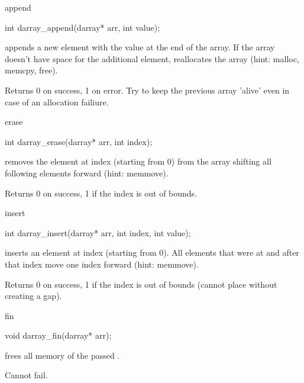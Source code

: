\documentclass[10pt,graphics,aspectratio=169,table]{beamer}
\begin{document}
\begin{frame}[fragile]{append}
    \begin{codeblock}
int darray_append(darray* arr, int value);
    \end{codeblock}

     appends a new element with the value  
    at the end of the array. If the array doesn't have space
    for the additional element, reallocates the array 
    (hint: malloc, memcpy, free).
    
    Returns 0 on success, 1 on error. Try to keep the previous array 'alive'
    even in case of an allocation failiure.
\end{frame}

\begin{frame}[fragile]{erase}
    \begin{codeblock}
int darray_erase(darray* arr, int index);
    \end{codeblock}

     removes the  element at index 
     (starting from 0) 
    from the array shifting all following elements forward (hint: memmove).
    
    Returns 0 on success, 1 if the index is out of bounds.
\end{frame}


\begin{frame}[fragile]{insert}
    \begin{codeblock}
int darray_insert(darray* arr, int index, int value);
    \end{codeblock}

     inserts an element at index  
     (starting from 0). 
    All elements that were at and after that index move one
    index forward (hint: memmove).
    
    Returns 0 on success, 1 if the index is out of bounds 
    (cannot place without creating a gap).
\end{frame}

\begin{frame}[fragile]{fin}
    \begin{codeblock}
void darray_fin(darray* arr);
    \end{codeblock}

     frees all memory of the passed .
 
    Cannot fail.
\end{frame}
\end{document}
